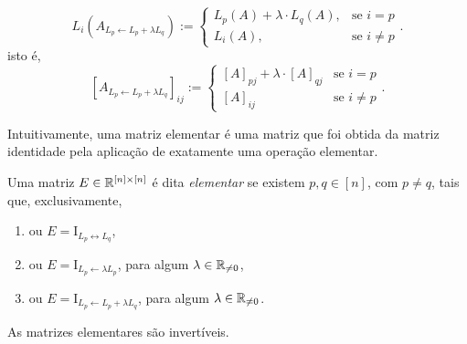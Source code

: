 \begin{definition}
\begin{enumerate}[leftmargin=*, align=left, label=\textbf{(\alph*)}]
                \[
                    L_i \left( A_{L_p \leftarrow L_p + \lambda L_q} \right) := 
                        \begin{cases}
                            L_p (A) + \lambda \cdot L_q (A), & \text{se } i = p \\
                            L_i (A), & \text{se } i \neq p
                        \end{cases}.
                \]
            isto é,
                \[
                    [A_{L_p \leftarrow L_p + \lambda L_q}]_{ij} :=
                        \begin{cases}
                            [A]_{pj} + \lambda \cdot [A]_{qj} & \text{se } i=p \\
                            [A]_{ij} & \text{se } i \neq p
                        \end{cases}.
                \]
        \end{enumerate}
\end{definition}

Intuitivamente, uma matriz elementar é uma matriz que foi obtida da matriz identidade pela aplicação de exatamente uma operação elementar.

\begin{definition}
    Uma matriz $E \in \mathbb{R}^{[n] \times [n]}$ é dita \emph{elementar} se existem $p, q \in [n]$, com $p \neq q$, tais que, exclusivamente,
        \begin{enumerate}[label=\roman*.]
            \item ou $E = \mathrm{I}_{L_p \leftrightarrow L_q}$,
            \item ou $E =  \mathrm{I}_{L_p \leftarrow \lambda L_p}$, para algum $\lambda \in \mathbb{R}_{\neq 0}$,
            \item ou $E =  \mathrm{I}_{L_p \leftarrow L_p + \lambda L_q}$, para algum $\lambda \in \mathbb{R}_{\neq 0}$.
        \end{enumerate}
\end{definition}

\begin{proposition}
    As matrizes elementares são invertíveis.
\end{proposition}

